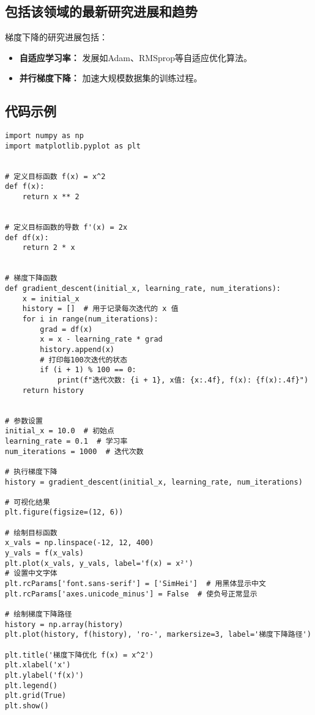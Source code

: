 \subsection*{包括该领域的最新研究进展和趋势}
梯度下降的研究进展包括：
\begin{itemize}
    \item \textbf{自适应学习率：} 发展如Adam、RMSprop等自适应优化算法。
    \item \textbf{并行梯度下降：} 加速大规模数据集的训练过程。
\end{itemize}
\subsection*{代码示例}
\begin{lstlisting}
import numpy as np
import matplotlib.pyplot as plt


# 定义目标函数 f(x) = x^2
def f(x):
    return x ** 2


# 定义目标函数的导数 f'(x) = 2x
def df(x):
    return 2 * x


# 梯度下降函数
def gradient_descent(initial_x, learning_rate, num_iterations):
    x = initial_x
    history = []  # 用于记录每次迭代的 x 值
    for i in range(num_iterations):
        grad = df(x)
        x = x - learning_rate * grad
        history.append(x)
        # 打印每100次迭代的状态
        if (i + 1) % 100 == 0:
            print(f"迭代次数: {i + 1}, x值: {x:.4f}, f(x): {f(x):.4f}")
    return history


# 参数设置
initial_x = 10.0  # 初始点
learning_rate = 0.1  # 学习率
num_iterations = 1000  # 迭代次数

# 执行梯度下降
history = gradient_descent(initial_x, learning_rate, num_iterations)

# 可视化结果
plt.figure(figsize=(12, 6))

# 绘制目标函数
x_vals = np.linspace(-12, 12, 400)
y_vals = f(x_vals)
plt.plot(x_vals, y_vals, label='f(x) = x²')
# 设置中文字体
plt.rcParams['font.sans-serif'] = ['SimHei']  # 用黑体显示中文
plt.rcParams['axes.unicode_minus'] = False  # 使负号正常显示

# 绘制梯度下降路径
history = np.array(history)
plt.plot(history, f(history), 'ro-', markersize=3, label='梯度下降路径')

plt.title('梯度下降优化 f(x) = x^2')
plt.xlabel('x')
plt.ylabel('f(x)')
plt.legend()
plt.grid(True)
plt.show()

\end{lstlisting}



